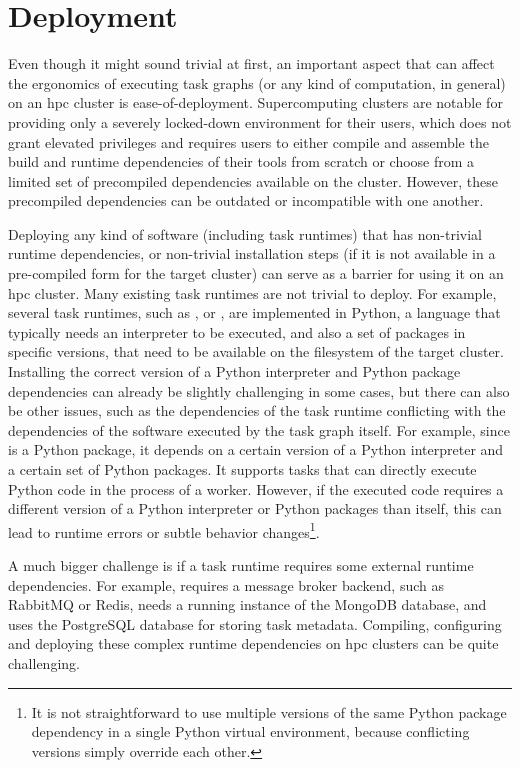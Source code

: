 \section{Deployment}
\label{challenge:deployment}
Even though it might sound trivial at first, an important aspect that can affect the ergonomics of
executing task graphs (or any kind of computation, in general) on an \gls{hpc}
cluster is ease-of-deployment. Supercomputing clusters are notable for providing only a severely
locked-down environment for their users, which does not grant elevated privileges and requires
users to either compile and assemble the build and runtime dependencies of their tools from scratch
or choose from a limited set of precompiled dependencies available on the cluster. However, these
precompiled dependencies can be outdated or incompatible with one another.

Deploying any kind of software (including task runtimes) that has non-trivial runtime dependencies,
or non-trivial installation steps (if it is not available in a pre-compiled form for the target
cluster) can serve as a barrier for using it on an \gls{hpc} cluster. Many existing
task runtimes are not trivial to deploy. For example, several task runtimes, such as
\dask{}, \snakemake{} or \pycompss{}, are implemented in
Python, a language that typically needs an interpreter to be executed, and also a set of packages
in specific versions, that need to be available on the filesystem of the target cluster. Installing
the correct version of a Python interpreter and Python package dependencies can already be slightly
challenging in some cases, but there can also be other issues, such as the dependencies of the task
runtime conflicting with the dependencies of the software executed by the task graph itself. For
example, since \dask{} is a Python package, it depends on a certain version of a
Python interpreter and a certain set of Python packages. It supports tasks that can directly
execute Python code in the process of a \dask{} worker. However, if the executed
code requires a different version of a Python interpreter or Python packages than
\dask{} itself, this can lead to runtime errors or subtle behavior
changes\footnote{It is not straightforward to use multiple versions of the same Python package dependency in a
single Python virtual environment, because conflicting versions simply override each other.}.

A much bigger challenge is if a task runtime requires some external runtime dependencies. For
example, \merlin{} requires a message broker backend, such as RabbitMQ or Redis,
\fireworks{} needs a running instance of the MongoDB database, and
\balsam{} uses the PostgreSQL database for storing task metadata. Compiling,
configuring and deploying these complex runtime dependencies on \gls{hpc} clusters
can be quite challenging.

